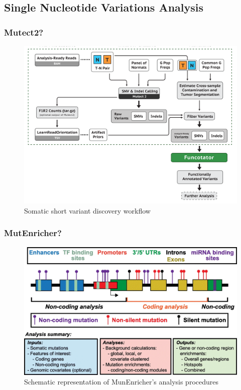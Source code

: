 \documentclass{beamer}
\begin{document}
    \subsection{Single Nucleotide Variations Analysis}
    \begin{frame}
        \frametitle{Mutect2?}

        \begin{figure}
            \includegraphics[width=0.6 \linewidth]{figures/Workflow/somatic_short_variants.png}
            \caption{Somatic short variant discovery workflow \protect\cite{gatk1, gatk2}}
        \end{figure}
    \end{frame}

    \begin{frame}
        \frametitle{MutEnricher?}

        \begin{figure}
            \includegraphics[width=0.8 \linewidth]{figures/Workflow/MutEnricher.jpg}
            \caption{Schematic representation of MunEnricher's analysis procedures \protect\cite{MutEnricher1}}
        \end{figure}
    \end{frame}
\end{document}

